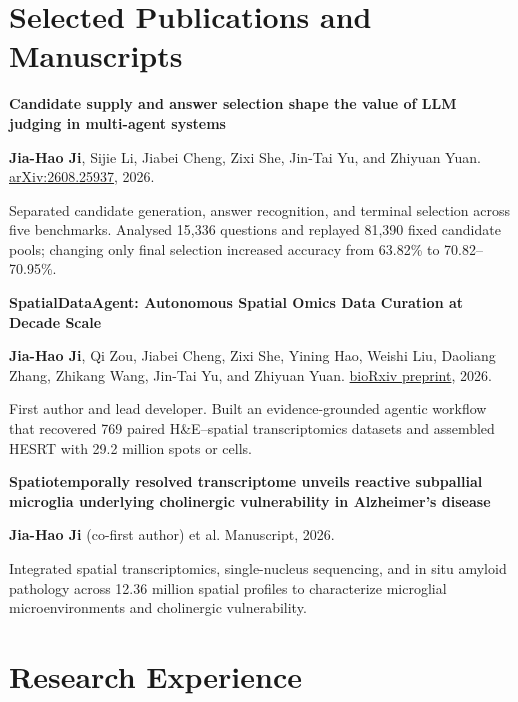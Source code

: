 \documentclass[10pt,a4paper]{article}
\newcommand{\pubtitle}[1]{{\fontsize{9.65}{11.0}\selectfont\bfseries\color{Ink}#1}}
\newcommand{\pubmeta}[1]{{\fontsize{8.35}{9.85}\selectfont\color{Muted}\RaggedRight #1}}
\newcommand{\pubimpact}[1]{{\fontsize{8.65}{10.25}\selectfont\RaggedRight #1}}
\begin{document}
\hfill
\begin{minipage}[t]{0.650\textwidth}
\vspace{0pt}
\RaggedRight

\section*{Selected Publications and Manuscripts}

\pubtitle{Candidate supply and answer selection shape the value of LLM judging in multi-agent systems}\par
\pubmeta{\textbf{Jia-Hao Ji}, Sijie Li, Jiabei Cheng, Zixi She, Jin-Tai Yu, and Zhiyuan Yuan. \href{https://arxiv.org/abs/2608.25937}{arXiv:2608.25937}, 2026.}\par
\pubimpact{Separated candidate generation, answer recognition, and terminal selection across five benchmarks. Analysed 15,336 questions and replayed 81,390 fixed candidate pools; changing only final selection increased accuracy from 63.82\% to 70.82--70.95\%.}\par

\vspace{0.30em}
\pubtitle{SpatialDataAgent: Autonomous Spatial Omics Data Curation at Decade Scale}\par
\pubmeta{\textbf{Jia-Hao Ji}, Qi Zou, Jiabei Cheng, Zixi She, Yining Hao, Weishi Liu, Daoliang Zhang, Zhikang Wang, Jin-Tai Yu, and Zhiyuan Yuan. \href{https://doi.org/10.64898/2026.05.27.727615}{bioRxiv preprint}, 2026.}\par
\pubimpact{First author and lead developer. Built an evidence-grounded agentic workflow that recovered 769 paired H\&E--spatial transcriptomics datasets and assembled HESRT with 29.2 million spots or cells.}\par

\vspace{0.30em}
\pubtitle{Spatiotemporally resolved transcriptome unveils reactive subpallial microglia underlying cholinergic vulnerability in Alzheimer's disease}\par
\pubmeta{\textbf{Jia-Hao Ji} (co-first author) et al. Manuscript, 2026.}\par
\pubimpact{Integrated spatial transcriptomics, single-nucleus sequencing, and in situ amyloid pathology across 12.36 million spatial profiles to characterize microglial microenvironments and cholinergic vulnerability.}\par

\section*{Research Experience}


\end{minipage}
\end{document}
